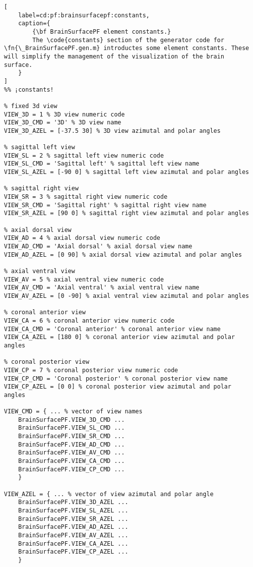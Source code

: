 \documentclass{tufte-handout}
\begin{document}
\begin{lstlisting}[
	label=cd:pf:brainsurfacepf:constants,
	caption={
		{\bf BrainSurfacePF element constants.}
		The \code{constants} section of the generator code for \fn{\_BrainSurfacePF.gen.m} introductes some element constants. These will simplify the management of the visualization of the brain surface.
	}
]
%% ¡constants!

% fixed 3d view
VIEW_3D	= 1 % 3D view numeric code
VIEW_3D_CMD = '3D' % 3D view name
VIEW_3D_AZEL = [-37.5 30] % 3D view azimutal and polar angles

% sagittal left view
VIEW_SL	= 2 % sagittal left view numeric code
VIEW_SL_CMD = 'Sagittal left' % sagittal left view name
VIEW_SL_AZEL = [-90 0] % sagittal left view azimutal and polar angles

% sagittal right view
VIEW_SR	= 3 % sagittal right view numeric code
VIEW_SR_CMD = 'Sagittal right' % sagittal right view name
VIEW_SR_AZEL = [90 0] % sagittal right view azimutal and polar angles 

% axial dorsal view
VIEW_AD = 4 % axial dorsal view numeric code
VIEW_AD_CMD = 'Axial dorsal' % axial dorsal view name
VIEW_AD_AZEL = [0 90] % axial dorsal view azimutal and polar angles

% axial ventral view
VIEW_AV = 5 % axial ventral view numeric code
VIEW_AV_CMD = 'Axial ventral' % axial ventral view name
VIEW_AV_AZEL = [0 -90] % axial ventral view azimutal and polar angles

% coronal anterior view
VIEW_CA = 6 % coronal anterior view numeric code
VIEW_CA_CMD = 'Coronal anterior' % coronal anterior view name
VIEW_CA_AZEL = [180 0] % coronal anterior view azimutal and polar angles

% coronal posterior view
VIEW_CP = 7 % coronal posterior view numeric code
VIEW_CP_CMD = 'Coronal posterior' % coronal posterior view name
VIEW_CP_AZEL = [0 0] % coronal posterior view azimutal and polar angles

VIEW_CMD = { ... % vector of view names
    BrainSurfacePF.VIEW_3D_CMD ...
    BrainSurfacePF.VIEW_SL_CMD ...
    BrainSurfacePF.VIEW_SR_CMD ...
    BrainSurfacePF.VIEW_AD_CMD ...
    BrainSurfacePF.VIEW_AV_CMD ...
    BrainSurfacePF.VIEW_CA_CMD ...
    BrainSurfacePF.VIEW_CP_CMD ...
    }

VIEW_AZEL = { ... % vector of view azimutal and polar angle
    BrainSurfacePF.VIEW_3D_AZEL ...
    BrainSurfacePF.VIEW_SL_AZEL ...
    BrainSurfacePF.VIEW_SR_AZEL ...
    BrainSurfacePF.VIEW_AD_AZEL ...
    BrainSurfacePF.VIEW_AV_AZEL ...
    BrainSurfacePF.VIEW_CA_AZEL ...
    BrainSurfacePF.VIEW_CP_AZEL ...
    }
\end{lstlisting}
\end{document}
